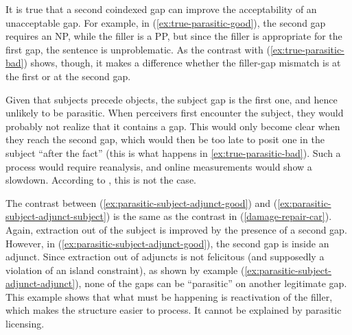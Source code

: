 It is true that a second coindexed gap can improve the acceptability of an unacceptable gap. For example, in (\ref{ex:true-parasitic-good}), the second gap requires an NP, while the filler is a PP, but since the filler is appropriate for the first gap, the sentence is unproblematic. As the contrast with (\ref{ex:true-parasitic-bad}) shows, though, it makes a difference whether the filler-gap mismatch is at the first or at the second gap. 

\begin{exe}
\sloppy
\ex \citep[62, my emphasis]{Chaves.2020.UDC}
\begin{xlist}
 \label{ex:true-parasitic-good}
 \label{ex:true-parasitic-bad}
\end{xlist}
\end{exe}

Given that subjects precede objects, the subject gap is the first one, and hence unlikely to be parasitic. When perceivers first encounter the subject, they would probably not realize that it contains a gap. This would only become clear when they reach the second gap, which would then be too late to posit one in the subject ``after the fact'' (this is what happens in \ref{ex:true-parasitic-bad}). Such a process would require reanalysis, and online measurements would show a slowdown. According to \citet{Chaves.2019.Frequency}, this is not the case.

The contrast between (\ref{ex:parasitic-subject-adjunct-good}) and  (\ref{ex:parasitic-subject-adjunct-subject}) is the same as the contrast in (\ref{damage-repair-car}). Again, extraction out of the subject is improved by the presence of a second gap. However, in (\ref{ex:parasitic-subject-adjunct-good}), the second gap is inside an adjunct. Since extraction out of adjuncts is not felicitous (and supposedly a violation of an island constraint), as shown by example (\ref{ex:parasitic-subject-adjunct-adjunct}), none of the gaps can be ``parasitic'' on another legitimate gap. This example shows that what must be happening is reactivation of the filler, which makes the structure easier to process. It cannot be explained by parasitic licensing. 

\begin{exe}
\ex \citep[305]{Chaves.2013}
\label{ex:parasitic-subject-adjunct}
\begin{xlist}
 \label{ex:parasitic-subject-adjunct-subject}
 \label{ex:parasitic-subject-adjunct-adjunct}
 \label{ex:parasitic-subject-adjunct-good} 
\end{xlist}
\end{exe}

